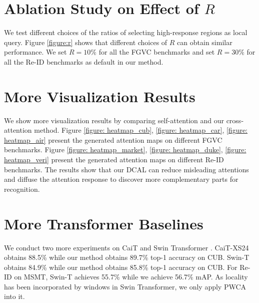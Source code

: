 \section{Ablation Study on Effect of $R$}
We test different choices of the ratios of selecting high-response regions as local query. Figure \ref{figure:r} shows that different choices of $R$ can obtain similar performance. We set $R=10\%$ for all the FGVC benchmarks and set $R=30\%$ for all the Re-ID benchmarks as default in our method. 

\section{More Visualization Results}
We show more visualization results by comparing self-attention and our cross-attention method. Figure \ref{figure: heatmap_cub}, \ref{figure: heatmap_car}, \ref{figure: heatmap_air} present the generated attention maps on different FGVC benchmarks. Figure \ref{figure: heatmap_market}, \ref{figure: heatmap_duke}, \ref{figure: heatmap_veri} present the generated attention maps on different Re-ID benchmarks. The results show that our DCAL can reduce misleading attentions and diffuse the attention response to discover more complementary parts for recognition.

\section{More Transformer Baselines}
We conduct two more experiments on CaiT \cite{touvron2021going} and Swin Transformer \cite{liu2021swin}. CaiT-XS24 obtains 88.5\% while our method obtains 89.7\% top-1 accuracy on CUB. Swin-T obtains 84.9\% while our method obtains 85.8\% top-1 accuracy on CUB. For Re-ID on MSMT, Swin-T achieves 55.7\% while we achieve 56.7\% mAP. As locality has been incorporated by windows in Swin Transformer, we only apply PWCA into it. 
